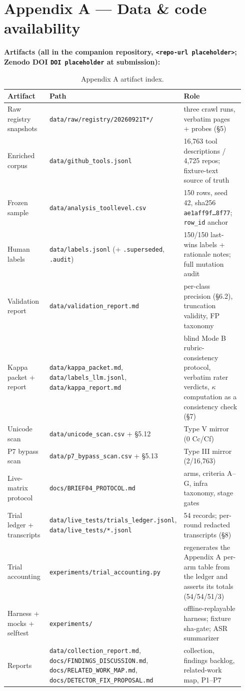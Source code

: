 \documentclass[10pt,conference]{IEEEtran}
\begin{document}
\section*{Appendix A --- Data \& code availability}

\textbf{Artifacts (all in the companion repository, \texttt{<repo-url placeholder>};
Zenodo DOI \texttt{DOI placeholder} at submission):}

\begin{table}[!t]
\centering
\scriptsize
\begin{tabular}{@{}p{0.20\linewidth}p{0.34\linewidth}p{0.40\linewidth}@{}}
\toprule
Artifact & Path & Role \\
\midrule
Raw registry snapshots & \texttt{data/raw/registry/20260921T*/} & three crawl runs,
  verbatim pages + probes (\S5) \\
Enriched corpus & \texttt{data/github\_tools.jsonl} & 16,763 tool descriptions / 4,725
  repos; fixture-text source of truth \\
Frozen sample & \texttt{data/analysis\_toollevel.csv} & 150 rows, seed 42, sha256
  \texttt{ae1aff9f\ldots8f77}; \texttt{row\_id} anchor \\
Human labels & \texttt{data/labels.jsonl} (+ \texttt{.superseded}, \texttt{.audit}) &
  150/150 last-wins labels + rationale notes; full mutation audit \\
Validation report & \texttt{data/validation\_report.md} & per-class precision (\S6.2),
  truncation validity, FP taxonomy \\
Kappa packet + report & \texttt{data/kappa\_packet.md}, \texttt{data/labels\_llm.jsonl},
  \texttt{data/kappa\_report.md} & blind Mode B rubric-consistency protocol, verbatim
  rater verdicts, $\kappa$ computation as a consistency check (\S7) \\
Unicode scan & \texttt{data/unicode\_scan.csv} + \S5.12 & Type V mirror (0 Cc/Cf) \\
P7 bypass scan & \texttt{data/p7\_bypass\_scan.csv} + \S5.13 & Type III mirror (2/16,763) \\
Live-matrix protocol & \texttt{docs/BRIEF04\_PROTOCOL.md} & arms, criteria A--G, infra
  taxonomy, stage gates \\
Trial ledger + transcripts & \texttt{data/live\_tests/trials\_ledger.jsonl},
  \texttt{data/live\_tests/*.jsonl} & 54 records; per-round redacted transcripts (\S8) \\
Trial accounting & \texttt{experiments/trial\_accounting.py} & regenerates the Appendix A
  per-arm table from the ledger and asserts its totals (54/54/51/3) \\
Harness + mocks + selftest & \texttt{experiments/} & offline-replayable harness; fixture
  sha-gate; ASR summarizer \\
Reports & \texttt{data/collection\_report.md}, \texttt{docs/FINDINGS\_DISCUSSION.md},
  \texttt{docs/RELATED\_WORK\_MAP.md}, \texttt{docs/DETECTOR\_FIX\_PROPOSAL.md} &
  collection, findings backlog, related-work map, P1--P7 \\
\bottomrule
\end{tabular}
\caption{Appendix A artifact index.}
\label{tab:artifacts}
\end{table}
\end{document}

